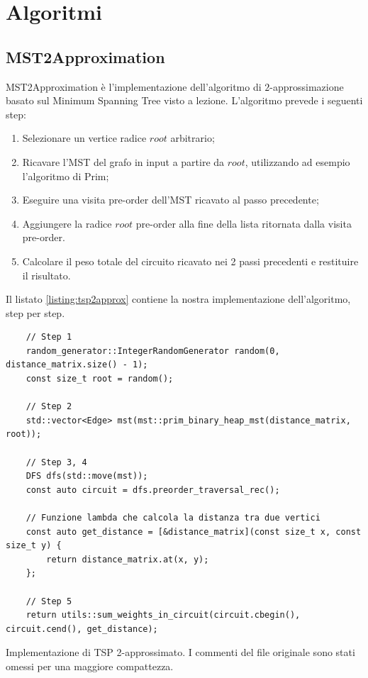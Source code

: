 
\section{Algoritmi}
\label{cap:algorithms}

\subsection{MST2Approximation}

MST2Approximation è l'implementazione dell'algoritmo di $2$-approssimazione basato sul Minimum Spanning Tree visto a lezione. L'algoritmo prevede i seguenti step:

\begin{enumerate}
    \item Selezionare un vertice radice $root$ arbitrario;
    \item Ricavare l'MST del grafo in input a partire da $root$, utilizzando ad esempio l'algoritmo di Prim;
    \item Eseguire una visita pre-order dell'MST ricavato al passo precedente;
    \item Aggiungere la radice $root$ pre-order alla fine della lista ritornata dalla visita pre-order.
    \item Calcolare il peso totale del circuito ricavato nei 2 passi precedenti e restituire il risultato.
\end{enumerate}

\noindent Il listato \ref{listing:tsp2approx} contiene la nostra implementazione dell'algoritmo, step per step.\\

\begin{listing}[!ht]
\begin{verbatim}
    // Step 1
    random_generator::IntegerRandomGenerator random(0, distance_matrix.size() - 1);
    const size_t root = random();

    // Step 2
    std::vector<Edge> mst(mst::prim_binary_heap_mst(distance_matrix, root));

    // Step 3, 4
    DFS dfs(std::move(mst));
    const auto circuit = dfs.preorder_traversal_rec();

    // Funzione lambda che calcola la distanza tra due vertici
    const auto get_distance = [&distance_matrix](const size_t x, const size_t y) {
        return distance_matrix.at(x, y);
    };

    // Step 5
    return utils::sum_weights_in_circuit(circuit.cbegin(), circuit.cend(), get_distance);
\end{verbatim}
\caption{Implementazione di TSP 2-approssimato. I commenti del file originale sono stati omessi per una maggiore compattezza.}
\label{listing:tsp2approx}
\end{listing}

